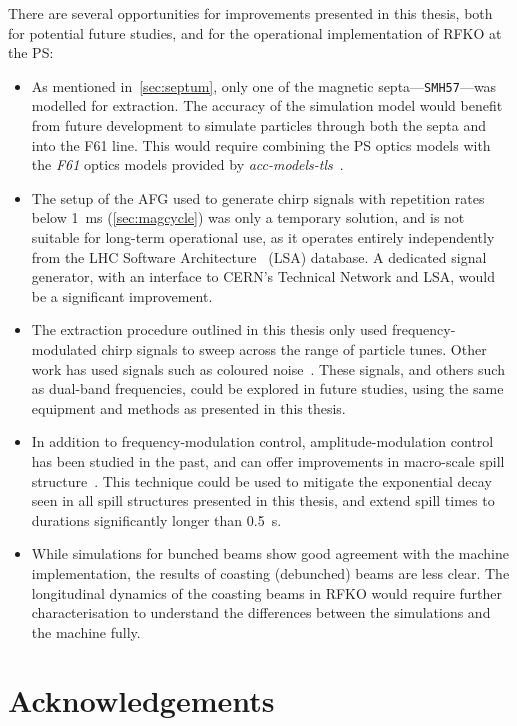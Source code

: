 \documentclass[a4paper,twoside,11pt]{report}
\begin{document}
There are several opportunities for improvements presented in this thesis, both for potential future studies, and for the operational implementation of RFKO at the PS:
\begin{itemize}
  \item As mentioned in~\autoref{sec:septum}, only one of the magnetic septa---\verb|SMH57|---was modelled for extraction. The accuracy of the simulation model would benefit from future development to simulate particles through both the septa and into the F61 line. This would require combining the PS optics models with the \textit{F61} optics models provided by \textit{acc-models-tls}~\cite{optics_repo}.
  \item The setup of the AFG used to generate chirp signals with repetition rates below \qty{1}{\milli\second} (\autoref{sec:magcycle}) was only a temporary solution, and is not suitable for long-term operational use, as it operates entirely independently from the LHC Software Architecture~\cite{Roderick:1215575} (LSA) database. A dedicated signal generator, with an interface to CERN's Technical Network and LSA, would be a significant improvement.
  \item The extraction procedure outlined in this thesis only used frequency-modulated chirp signals to sweep across the range of particle tunes. Other work has used signals such as coloured noise~\cite{Nagaslaev:2011zz}. These signals, and others such as dual-band frequencies, could be explored in future studies, using the same equipment and methods as presented in this thesis.
  \item In addition to frequency-modulation control, amplitude-modulation control has been studied in the past, and can offer improvements in macro-scale spill structure~\cite{NODA2002241}. This technique could be used to mitigate the exponential decay seen in all spill structures presented in this thesis, and extend spill times to durations significantly longer than \qty{0.5}{\second}.
  \item While simulations for bunched beams show good agreement with the machine implementation, the results of coasting (debunched) beams are less clear. The longitudinal dynamics of the coasting beams in RFKO would require further characterisation to understand the differences between the simulations and the machine fully.
\end{itemize}


\chapter{Acknowledgements}

%  

 
\end{document}
